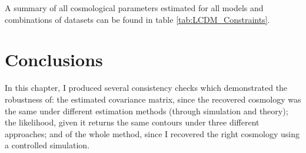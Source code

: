 \qquad A summary of all cosmological parameters estimated for all models and combinations of datasets can be found in table \ref{tab:LCDM_Constraints}.

\section{Conclusions}
In this chapter, I produced several consistency checks which demonstrated the robustness of: the estimated covariance matrix, since the recovered cosmology was the same under different estimation methods (through simulation and theory); the likelihood, given it returns the same contours under three different approaches; and of the whole method, since I recovered the right cosmology using a controlled simulation.

